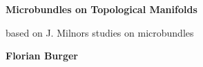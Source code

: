 \begin{titlepage}
    \begin{center}

        \vfill %

        \Huge
        \textbf{Microbundles on Topological Manifolds}

        \vspace{0.5cm} %

        \LARGE
        based on J. Milnors studies on microbundles

        \vspace{1.5cm} %

        \textbf{Florian Burger}
    \end{center}
\end{titlepage}